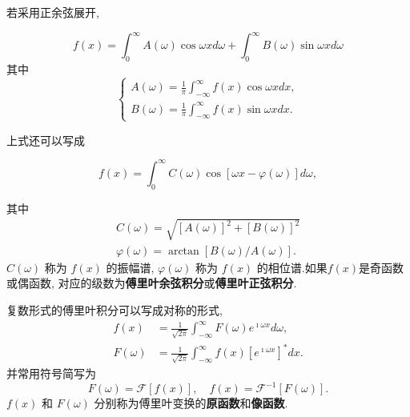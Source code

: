 若采用正余弦展开,

\begin{equation}
    f(x) =\int_{0}^{\infty} A(\omega) \cos {\omega x} d\omega + \int_{0}^{\infty} B(\omega) \sin {\omega x} d\omega
\end{equation}
其中
\begin{equation}
    \left\{\begin{array}{l}
    A(\omega)=\frac{1}{\pi} \int_{-\infty}^{\infty} f(x) \cos \omega x d x, \\
    B(\omega)=\frac{1}{\pi} \int_{-\infty}^{\infty} f(x) \sin \omega x d x .
    \end{array}\right.
\end{equation}

上式还可以写成

\begin{equation}
    f(x)=\int_0^{\infty} C(\omega) \cos [\omega x-\varphi(\omega)] d \omega,
\end{equation}

其中
$$
\begin{gathered}
C(\omega)=\sqrt{[A(\omega)]^2+[B(\omega)]^2} \\
\varphi(\omega)=\arctan [B(\omega) / A(\omega)] .
\end{gathered}
$$
$C(\omega)$ 称为 $f(x)$ 的振幅谱, $\varphi(\omega)$ 称为 $f(x)$ 的相位谱.如果$f(x)$是奇函数或偶函数,
对应的级数为\textbf{傅里叶余弦积分}或\textbf{傅里叶正弦积分}.

复数形式的傅里叶积分可以写成对称的形式,
\begin{equation}
    \begin{aligned}
    f(x) & =\frac{1}{\sqrt{2 \pi}} \int_{-\infty}^{\infty} F(\omega)e^{\imath \omega x} d \omega, \\
    F(\omega) & =\frac{1}{\sqrt{2 \pi}} \int_{-\infty}^{\infty} f(x)\left[e^{\imath \omega x}\right]^* d x .
    \end{aligned}
\end{equation}
并常用符号简写为
$$
F(\omega)=\mathcal{F}[f(x)], \quad f(x)=\mathcal{F}^{-1}[F(\omega)] .
$$
$f(x)$ 和 $F(\omega)$ 分别称为傅里叶变换的\textbf{原函数}和\textbf{像函数}.

